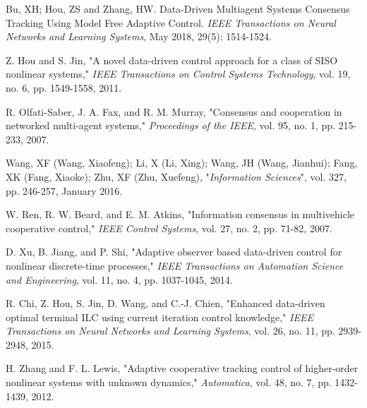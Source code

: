 \documentclass[journal,onecolumn]{IEEEtran}
\begin{document}





\begin{thebibliography}{99}
    
    Bu, XH; Hou, ZS and Zhang, HW. Data-Driven Multiagent Systems Consensus Tracking Using Model Free Adaptive Control. \textit{IEEE Transactions on Neural Networks and Learning Systems}, May 2018, 29(5): 1514-1524.
    
    Z. Hou and S. Jin, "A novel data-driven control approach for a class of SISO nonlinear systems," \textit{IEEE Transactions on Control Systems Technology}, vol. 19, no. 6, pp. 1549-1558, 2011.
    
    R. Olfati-Saber, J. A. Fax, and R. M. Murray, "Consensus and cooperation in networked multi-agent systems," \textit{Proceedings of the IEEE}, vol. 95, no. 1, pp. 215-233, 2007.
    
    Wang, XF (Wang, Xiaofeng); Li, X (Li, Xing); Wang, JH (Wang, Jianhui); Fang, XK (Fang, Xiaoke); Zhu, XF (Zhu, Xuefeng), "\textit{Information Sciences}", vol. 327, pp. 246-257, January 2016.
    
    W. Ren, R. W. Beard, and E. M. Atkins, "Information consensus in multivehicle cooperative control," \textit{IEEE Control Systems}, vol. 27, no. 2, pp. 71-82, 2007.
    
    D. Xu, B. Jiang, and P. Shi, "Adaptive observer based data-driven control for nonlinear discrete-time processes," \textit{IEEE Transactions on Automation Science and Engineering}, vol. 11, no. 4, pp. 1037-1045, 2014.
    
    R. Chi, Z. Hou, S. Jin, D. Wang, and C.-J. Chien, "Enhanced data-driven optimal terminal ILC using current iteration control knowledge," \textit{IEEE Transactions on Neural Networks and Learning Systems}, vol. 26, no. 11, pp. 2939-2948, 2015.
    
    H. Zhang and F. L. Lewis, "Adaptive cooperative tracking control of higher-order nonlinear systems with unknown dynamics," \textit{Automatica}, vol. 48, no. 7, pp. 1432-1439, 2012.
    

\end{thebibliography}
\end{document}
